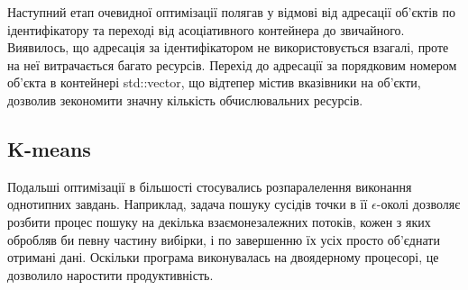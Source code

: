             Наступний етап очевидної оптимізації полягав у відмові від адресації об'єктів по ідентифікатору та переході від асоціативного контейнера до звичайного. Виявилось, що адресація за ідентифікатором не використовується взагалі, проте на неї витрачається багато ресурсів. Перехід до адресації за порядковим номером об'єкта в контейнері std::vector, що відтепер містив вказівники на об'єкти, дозволив зекономити значну кількість обчислювальних ресурсів.
            
            \subsection{K-means}
                
            
            Подальші оптимізації в більшості стосувались розпаралелення виконання однотипних завдань. Наприклад, задача пошуку сусідів точки в її $\epsilon$-околі дозволяє розбити процес пошуку на декілька взаємонезалежних потоків, кожен з яких обробляв би певну частину вибірки, і по завершенню їх усіх просто об'єднати отримані дані. Оскільки програма виконувалась на двоядерному процесорі, це дозволило наростити продуктивність.          
